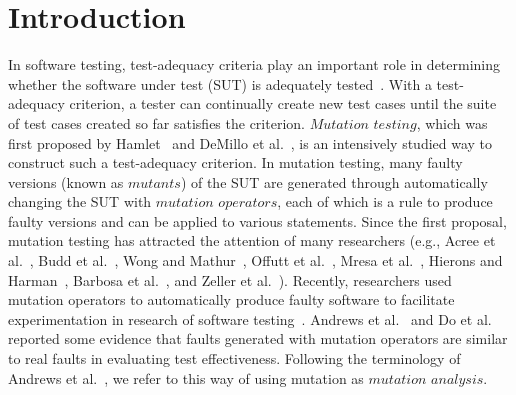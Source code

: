 
\section{Introduction}
\label{Introduction}

In software testing, test-adequacy criteria play an important role
in determining whether the software under test (SUT) is adequately
tested~\cite{Goodenough:75,Zhu:96}. With a test-adequacy criterion,
a tester can continually create new test cases until the suite of
test cases created so far satisfies the criterion. $Mutation$
$testing$, which was first proposed by Hamlet~\cite{Hamlet:77} and
DeMillo et al.~\cite{DeMillo:78}, is an intensively studied way to
construct such a test-adequacy criterion. In mutation testing, many
faulty versions (known as $mutants$) of the SUT are generated
through automatically changing the SUT with $mutation$ $operators$,
each of which is a rule to produce faulty versions and can be
applied to various statements. Since the first proposal, mutation
testing has attracted the attention of many researchers (e.g., Acree
et al.~\cite{Acree:79}, Budd et al.~\cite{Budd:80b}, Wong and
Mathur~\cite{Mathur:91,Wong:93,Wong:95}, Offutt et
al.~\cite{Offutt:92,Offutt:94,Offutt:96,Offutt:97,Offutt:99,Ma:05},
Mresa et al.~\cite{Mresa:99}, Hierons and Harman~\cite{Hierons:99},
Barbosa et al.~\cite{Barbosa:01}, and Zeller et
al.~\cite{Grun:09,Schuler:09}). Recently, researchers used mutation
operators to automatically produce faulty software to facilitate
experimentation in research of software
testing~\cite{Briand:04,Briand:06,Mayer:06,Tuya:07}. Andrews et
al.~\cite{Andrews:05} and Do et al.~\cite{Do:06} reported some
evidence that faults generated with mutation operators are similar
to real faults in evaluating test effectiveness. Following the
terminology of Andrews et al.~\cite{Andrews:05,SiamiNamin:08}, we
refer to this way of using mutation as $mutation$ $analysis$.

